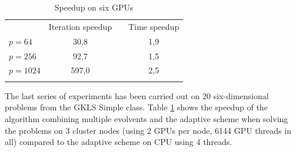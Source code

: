 \documentclass{svproc}
\begin{document}
\begin{table}
                \caption{Speedup on six GPUs}
                \label{table:GKLS6_average_MMAS_GPU}
                \center
                \begin{tabular}{lccc}
                &  Iteration speedup & &   Time speedup \\
                               \noalign{\smallskip} \hline \noalign{\smallskip}                               
                               $p=64$  &    30,8	 & & 1,9	  \\
                               $p=256$ &    92,7	 & & 1,5  \\
							   $p=1024$&    597,0	 & & 2,5  \\
                               \noalign{\smallskip}\hline
                \end{tabular}
\end{table}


The last series of experiments has been carried out on 20 six-dimensional problems from the GKLS Simple class. 
Table \ref{table:GKLS6_average_MMAS_GPU} shows the speedup of the algorithm combining multiple evolvents and the adaptive scheme when solving the problems on 3 cluster nodes (using 2 GPUs per node, 6144 GPU threads in all) compared to the adaptive scheme on CPU using 4 threads.

\end{document}
